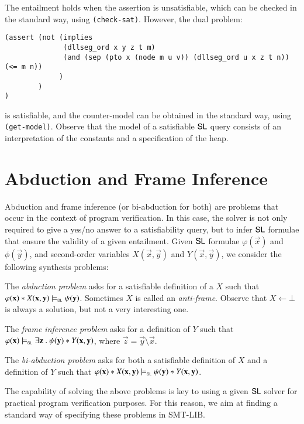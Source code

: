 \documentclass{llncs}
\begin{document}
The entailment holds when the assertion is unsatisfiable, which can be
checked in the standard way, using {\tt (check-sat)}. However, the
dual problem:
\begin{verbatim}
(assert (not (implies 
              (dllseg_ord x y z t m)
              (and (sep (pto x (node m u v)) (dllseg_ord u x z t n)) (<= m n)) 
             )
        )
)
\end{verbatim}
is satisfiable, and the counter-model can be obtained in the standard
way, using {\tt (get-model)}. Observe that the model of a satisfiable
$\mathsf{SL}$ query consists of an interpretation of the constants and a
specification of the heap. 

\section{Abduction and Frame Inference}

Abduction and frame inference (or bi-abduction for both) are problems
that occur in the context of program verification. In this case, the
solver is not only required to give a yes/no answer to a
satisfiability query, but to infer $\mathsf{SL}$ formulae that ensure the
validity of a given entailment. Given $\mathsf{SL}$ formulae
$\varphi(\vec{x})$ and $\phi(\vec{y})$, and second-order variables
$X(\vec{x},\vec{y})$ and $Y(\vec{x},\vec{y})$, we consider the
following synthesis problems:

\begin{compactenum}
\item The \emph{abduction problem} asks for a satisfiable definition
  of a $X$ such that $\varphi(\mathbf x) * X(\mathbf x,\mathbf y)
  \models_{\mathsf{\scriptscriptstyle{SL}}} \psi(\mathbf y)$. Sometimes $X$ is called an
  \emph{anti-frame}. Observe that $X \leftarrow \bot$ is always a
  solution, but not a very interesting one.
%
\item The \emph{frame inference problem} asks for a definition of $Y$
  such that $\varphi(\mathbf x) \models_{\mathsf{\scriptscriptstyle{SL}}} \exists \mathbf z
  ~.~ \psi(\mathbf y) * Y(\mathbf x,\mathbf y)$, where $\vec{z} = \vec{y}
  \setminus \vec{x}$.
%
\item The \emph{bi-abduction problem} asks for both a satisfiable
  definition of $X$ and a definition of $Y$ such that
  $\varphi(\mathbf x) * X(\mathbf x,\mathbf y) \models_{\mathsf{\scriptscriptstyle{SL}}}
  \psi(\mathbf y) * Y(\mathbf x,\mathbf y)$.
\end{compactenum}
The capability of solving the above problems is key to using a given
$\mathsf{SL}$ solver for practical program verification purposes. For this
reason, we aim at finding a standard way of specifying these problems
in SMT-LIB.
\end{document}
